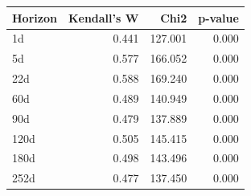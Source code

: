 \begin{tabular}{lrrr}
\toprule
Horizon & Kendall's W & Chi2 & p-value \\
\midrule
1d & 0.441 & 127.001 & 0.000 \\
5d & 0.577 & 166.052 & 0.000 \\
22d & 0.588 & 169.240 & 0.000 \\
60d & 0.489 & 140.949 & 0.000 \\
90d & 0.479 & 137.889 & 0.000 \\
120d & 0.505 & 145.415 & 0.000 \\
180d & 0.498 & 143.496 & 0.000 \\
252d & 0.477 & 137.450 & 0.000 \\
\bottomrule
\end{tabular}
